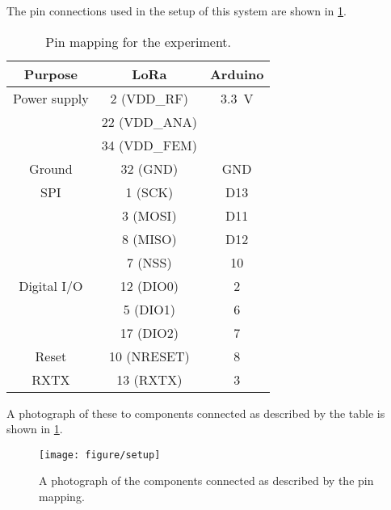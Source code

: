 The pin connections used in the setup of this system are shown in \cref{tab:pinmap}.
\begin{table}[ht]
  \centering
  \begin{tabular}{c | c | c}
    Purpose      & LoRa & Arduino \\ \hline
    Power supply & 2 (VDD\_RF)   & \SI{3.3}{\volt} \\
                 & 22 (VDD\_ANA) & \\
                 & 34 (VDD\_FEM) & \\ \hline
    Ground & 32 (GND) & GND \\ \hline
    SPI & 1 (SCK) & D13 \\
                 & 3 (MOSI) & D11 \\
                 & 8 (MISO) & D12 \\
                 & 7 (NSS) & 10 \\ \hline
    Digital I/O & 12 (DIO0) & 2 \\
                 & 5 (DIO1) & 6 \\
                 & 17 (DIO2) & 7 \\ \hline
    Reset & 10 (NRESET) & 8 \\ \hline
    RXTX & 13 (RXTX) & 3
  \end{tabular}
  \caption{Pin mapping for the experiment.}
  \label{tab:pinmap}
\end{table}
A photograph of these to components connected as described by the table is shown in \cref{fig:photo}.
\begin{figure}[ht]
  \centering
  \texttt{[image: figure/setup]}
  \caption{A photograph of the components connected as described by the pin mapping.}
  \label{fig:photo}
\end{figure}
